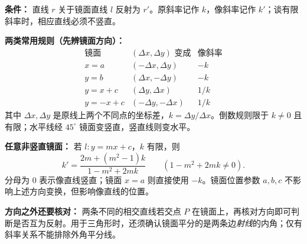 \begin{statementbox}
\textbf{条件：} 直线 $r$ 关于镜面直线 $l$ 反射为 $r'$。原斜率记作 $k$，像斜率记作 $k'$；谈有限斜率时，相应直线必须不竖直。

\begin{center}

\end{center}

\textbf{两类常用规则（先辨镜面方向）：}
\[
\boxed{\begin{array}{c|c|c}
\text{镜面}&(\Delta x,\Delta y)\text{ 变成}&\text{像斜率}\\ \hline
x=a&(-\Delta x,\Delta y)&-k\\
y=b&(\Delta x,-\Delta y)&-k\\
y=x+c&(\Delta y,\Delta x)&1/k\\
y=-x+c&(-\Delta y,-\Delta x)&1/k
\end{array}}
\]
其中 $\Delta x,\Delta y$ 是原线上两个不同点的坐标差，$k=\Delta y/\Delta x$。倒数规则限于 $k\ne0$ 且有限；水平线经 $45^\circ$ 镜面变竖直，竖直线则变水平。

\medskip
\textbf{任意非竖直镜面：} 若 $l:y=mx+c$，$k$ 有限，则
\[
\boxed{k'=\frac{2m+(m^2-1)k}{1-m^2+2mk}}\qquad(1-m^2+2mk\ne0).
\]
分母为 $0$ 表示像直线竖直；镜面 $x=a$ 则直接使用 $-k$。镜面位置参数 $a,b,c$ 不影响上述方向变换，但影响像直线的位置。

\medskip
\textbf{方向之外还要核对：} 两条不同的相交直线若交点 $P$ 在镜面上，再核对方向即可判断是否互为反射。用于三角形时，还须确认镜面平分的是两条边\emph{射线}的内角；仅有斜率关系不能排除外角平分线。
\end{statementbox}
